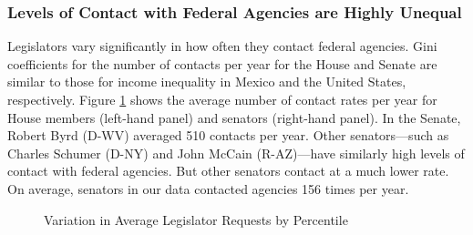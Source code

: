 \documentclass[12pt]{article}
\begin{document}
\subsubsection{Levels of Contact with Federal Agencies are Highly Unequal}
Legislators vary significantly in how often they contact federal agencies. Gini coefficients for the number of contacts per year for the House and Senate are similar to those for income inequality in Mexico and the United States, respectively. Figure \ref{f:contact1} shows the average number of contact rates per year for House members (left-hand panel) and senators (right-hand panel). 
In the Senate, Robert Byrd (D-WV) averaged 510 contacts per year. Other senators---such as Charles Schumer (D-NY) and John McCain (R-AZ)---have similarly high levels of contact with federal agencies. But other senators contact at a much lower rate. 
On average, senators in our data contacted agencies 156 times per year.   
 
\begin{figure}
\centering
\caption{Variation in Average Legislator Requests by Percentile} \label{f:contact1} 
\begin{minipage}{\textwidth}
\end{minipage}
\end{figure}
\end{document}

